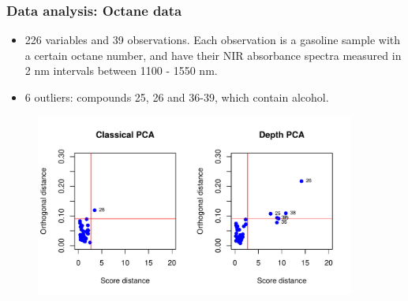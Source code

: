 \documentclass[handout,10pt]{beamer}
\begin{document}
\begin{frame}
\frametitle{Data analysis: Octane data}
\begin{itemize}
\item 226 variables and 39 observations. Each observation is a gasoline sample with a certain octane number, and have their NIR absorbance spectra measured in 2 nm intervals between 1100 - 1550 nm.
\vspace{.2cm}
\item 6 outliers: compounds 25, 26 and 36-39, which contain alcohol.
\end{itemize}

\begin{figure}[h]
	\centering
		\includegraphics[height=6cm]{octane_distanceplot.pdf}
	\label{fig:distplot}
\end{figure}
\end{frame}
\end{document}
